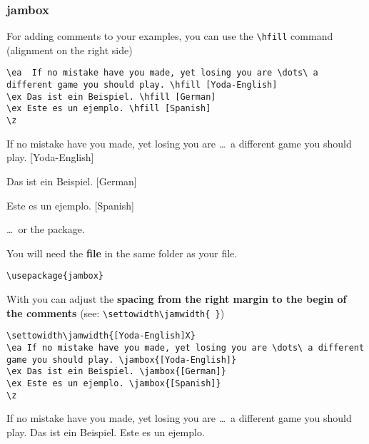 \begin{frame}[fragile]
\frametitle{jambox}

For adding comments to your examples, you can use the \lstinline|\hfill| command (alignment on the right side)

\begin{lstlisting}
\ea  If no mistake have you made, yet losing you are \dots\ a different game you should play. \hfill [Yoda-English]
\ex Das ist ein Beispiel. \hfill [German]
\ex Este es un ejemplo. \hfill [Spanish]
\z 

\end{lstlisting}
\ea If no mistake have you made, yet losing you are \dots\ a different game you should play. \hfill [Yoda-English]

\ex Das ist ein Beispiel. \hfill [German]

\ex Este es un ejemplo. \hfill [Spanish]
\z 

\end{frame}


\begin{frame}[fragile]

\dots\ or the  package.

\smallskip

You will need the \textbf{ file} in the same folder as your  file.

\begin{lstlisting}
\usepackage{jambox}
\end{lstlisting}

\smallskip

\pause 

With  you can adjust the \textbf{spacing from the right margin to the begin of the comments} (see: \lstinline|\settowidth\jamwidth{ }|)

\begin{lstlisting}
\settowidth\jamwidth{[Yoda-English]X} 
\ea If no mistake have you made, yet losing you are \dots\ a different game you should play. \jambox{[Yoda-English]}
\ex Das ist ein Beispiel. \jambox{[German]}
\ex Este es un ejemplo. \jambox{[Spanish]}
\z 
\end{lstlisting}

\settowidth{} 
\ea If no mistake have you made, yet losing you are \dots\ a different game you should play. 
\ex Das ist ein Beispiel. \jambox{[German]}
\ex Este es un ejemplo. \jambox{[Spanish]}
\z 

\end{frame}


